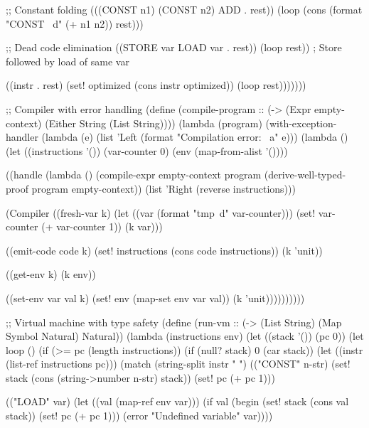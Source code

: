 \begin{example}
\begin{lambdustcode}
          ;; Constant folding
          (((CONST n1) (CONST n2) ADD . rest))
           (loop (cons (format "CONST ~d" (+ n1 n2)) rest)))
          
          ;; Dead code elimination
          ((STORE var LOAD var . rest))
           (loop rest))  ; Store followed by load of same var
          
          ((instr . rest)
           (set! optimized (cons instr optimized))
           (loop rest)))))))

;; Compiler with error handling
(define (compile-program :: (-> (Expr empty-context) 
                               (Either String (List String))))
  (lambda (program)
    (with-exception-handler
      (lambda (e)
        (list 'Left (format "Compilation error: ~a" e)))
      (lambda ()
        (let ((instructions '())
              (var-counter 0)
              (env (map-from-alist '())))
          
          ((handle 
             (lambda () 
               (compile-expr empty-context program 
                           (derive-well-typed-proof program empty-context))
               (list 'Right (reverse instructions)))
             
             (Compiler
               ((fresh-var k)
                (let ((var (format "tmp~d" var-counter)))
                  (set! var-counter (+ var-counter 1))
                  (k var)))
               
               ((emit-code code k)
                (set! instructions (cons code instructions))
                (k 'unit))
               
               ((get-env k)
                (k env))
               
               ((set-env var val k)
                (set! env (map-set env var val))
                (k 'unit))))))))))

;; Virtual machine with type safety
(define (run-vm :: (-> (List String) (Map Symbol Natural) Natural))
  (lambda (instructions env)
    (let ((stack '())
          (pc 0))
      (let loop ()
        (if (>= pc (length instructions))
            (if (null? stack)
                0
                (car stack))
            (let ((instr (list-ref instructions pc)))
              (match (string-split instr " ")
                (("CONST" n-str)
                 (set! stack (cons (string->number n-str) stack))
                 (set! pc (+ pc 1)))
                
                (("LOAD" var)
                 (let ((val (map-ref env var)))
                   (if val
                       (begin
                         (set! stack (cons val stack))
                         (set! pc (+ pc 1)))
                       (error "Undefined variable" var))))
                

\end{lambdustcode}
\end{example}
